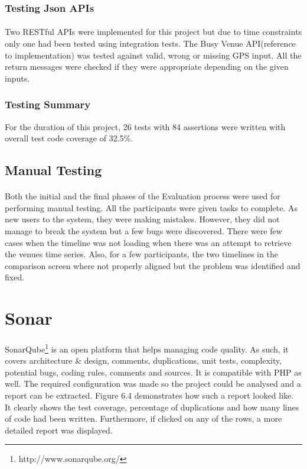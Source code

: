 \documentclass{l4proj}
\begin{document}
\subsubsection{Testing Json APIs}
\paragraph{}
Two RESTful APIs were implemented for this project but due to time constraints only one had been tested using integration tests. The Busy Venue API(reference to implementation) was tested against valid, wrong or missing GPS input. All the return messages were checked if they were appropriate depending on the given inputs.

\subsubsection{Testing Summary}
For the duration of this project, 26 tests with 84 assertions were written with overall test code coverage of 32.5\%.

\subsection{Manual Testing}
\paragraph{}
Both the initial and the final phases of the Evaluation process were used for performing manual testing. All the participants were given tasks to complete. As new users to the system, they were making mistakes. However, they did not manage to break the system but a few bugs were discovered. There were few cases when the timeline was not loading when there was an attempt to retrieve the venue\textquotesingle s time series. Also, for a few participants, the two timelines in the comparison screen where not properly aligned but the problem was identified and fixed.

\section{Sonar}
\paragraph{}
SonarQube\footnote{http://www.sonarqube.org/} is an open platform that helps managing code quality. As such, it covers architecture \& design, comments, duplications, unit tests, complexity, potential bugs, coding rules, comments and sources. It is compatible with PHP as well. The required configuration was made so the project could be analysed and a report can be extracted. Figure 6.4 demonstrates how such a report looked like. It clearly shows the test coverage, percentage of duplications and how many lines of code had been written. Furthermore, if clicked on any of the rows, a more detailed report was displayed.  
\end{document}
